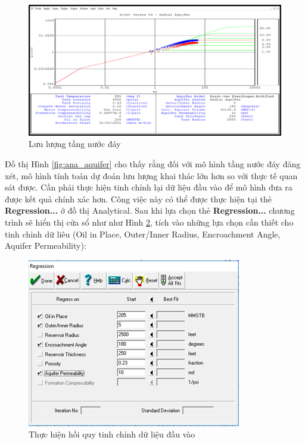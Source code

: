 \documentclass[12pt,a4paper]{report}
\begin{document}
        \begin{figure}[h]
        	\centering
            \includegraphics[scale=0.6]{Fig/wd_aquifer.png}
            \caption{Lưu lượng tầng nước đáy}
            \label{fig:wd_aquifer}
        \end{figure}
        \clearpage
        \noindent
Đồ thị Hình \ref{fig:ana_aquifer} cho thấy rằng đối với mô hình tầng nước đáy đăng xét, mô hình tính toán dự đoán lưu lượng khai thác lớn hơn so với thực tế quan sát được. Cần phải thực hiện tinh chỉnh lại dữ liệu đầu vào để mô hình đưa ra được kết quả chính xác hơn. Công việc này có thể được thực hiện tại thẻ \textbf{Regression...} ở đồ thị Analytical. Sau khi lựa chọn thẻ \textbf{Regression...} chương trình sẽ hiển thị cửa sổ như như Hình \ref{fig:before_reg}, tích vào những lựa chọn cần thiết cho tinh chỉnh dữ liêu (Oil in Place, Outer/Inner Radius, Encroachment Angle, Aquifer Permeability):
		\begin{figure}[h]
        	\centering
            \includegraphics[scale=1.6]{Fig/before_regression.png}
            \caption{Thực hiện hồi quy tinh chỉnh dữ liệu đầu vào}
            \label{fig:before_reg}
        \end{figure}
\end{document}
